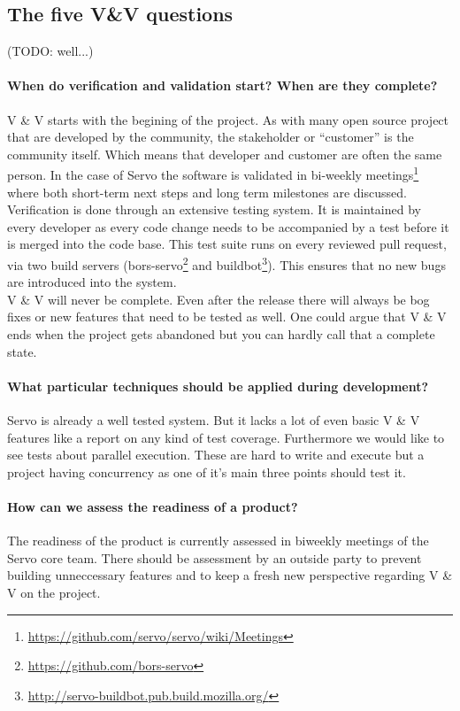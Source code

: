 \documentclass{scrartcl}
\newcommand{\todo}[1] {{\color{red}(TODO: #1)}}
\begin{document}
\subsection{The five V\&V questions}
\todo{well...}

\paragraph{When do verification and validation start? When are they complete?}
V \& V starts with the begining of the project. As with many open source project that are developed by the community, the stakeholder or ``customer'' is the community itself. Which means that developer and customer are often the same person. In the case of Servo the software is validated in bi-weekly meetings\footnote{\url{https://github.com/servo/servo/wiki/Meetings}} where both short-term next steps and long term milestones are discussed.\\
  
  Verification is done through an extensive testing system. It is maintained by every developer as every code change needs to be accompanied by a test before it is merged into the code base. This test suite runs on every reviewed pull request, via two build servers (bors-servo\footnote{\url{https://github.com/bors-servo}} and buildbot\footnote{\url{http://servo-buildbot.pub.build.mozilla.org/}}). This ensures that no new bugs are introduced into the system.\\
  
V \& V will never be complete. Even after the release there will always be bog fixes or new features that need to be tested as well. One could argue that V \& V ends when the project gets abandoned but you can hardly call that a complete state.

\paragraph{What particular techniques should be applied during development?}
Servo is already a well tested system. But it lacks a lot of even basic V \& V features like a report on any kind of test coverage. Furthermore we would like to see tests about parallel execution. These are hard to write and execute but a project having concurrency as one of it's main three points should test it.

\paragraph{How can we assess the readiness of a product?} 
The readiness of the product is currently assessed in biweekly meetings of the Servo core team. There should be assessment by an outside party to prevent building unneccessary features and to keep a fresh new perspective regarding V \& V on the project.
\end{document}
